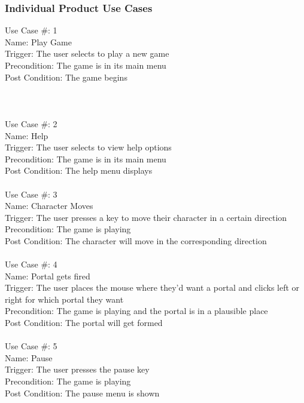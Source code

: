 \documentclass[12pt, titlepage]{article}
\begin{document}
\subsubsection{Individual Product Use Cases}

Use Case \#: 1\\
Name: Play Game\\
Trigger: The user selects to play a new game\\
Precondition: The game is in its main menu\\
Post Condition: The game begins\\
\\
\\
\\
Use Case \#: 2\\
Name: Help \\
Trigger: The user selects to view help options\\
Precondition: The game is in its main menu\\
Post Condition: The help menu displays\\
\\
Use Case \#: 3\\
Name: Character Moves\\
Trigger: The user presses a key to move their character in a certain direction\\
Precondition: The game is playing\\
Post Condition: The character will move in the corresponding direction\\
\\
Use Case \#: 4\\
Name: Portal gets fired\\
Trigger: The user places the mouse where they'd want a portal and clicks left or right for which portal they want\\
Precondition: The game is playing and the portal is in a plausible place\\
Post Condition: The portal will get formed\\
\\
Use Case \#: 5\\
Name: Pause\\
Trigger: The user presses the pause key\\
Precondition: The game is playing\\
Post Condition: The pause menu is shown\\
\end{document}
